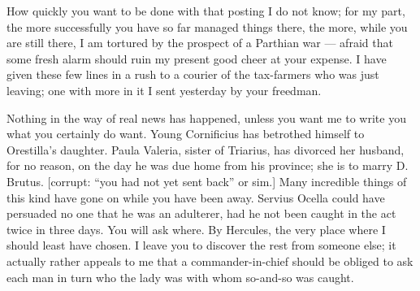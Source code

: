 

 How quickly you want to be done with that posting I do not know; for my part, the more successfully you have so far managed things there, the more, while you are still there, I am tortured by the prospect of a Parthian war --- afraid that some fresh alarm should ruin my present good cheer at your expense. I have given these few lines in a rush to a courier of the tax-farmers who was just leaving; one with more in it I sent yesterday by your freedman.

 Nothing in the way of real news has happened, unless you want me to write you what you certainly do want. Young Cornificius has betrothed himself to Orestilla's daughter. Paula Valeria, sister of Triarius, has divorced her husband, for no reason, on the day he was due home from his province; she is to marry D. Brutus. [corrupt: ``you had not yet sent back'' or sim.] Many incredible things of this kind have gone on while you have been away. Servius Ocella could have persuaded no one that he was an adulterer, had he not been caught in the act twice in three days. You will ask where. By Hercules, the very place where I should least have chosen. I leave you to discover the rest from someone else; it actually rather appeals to me that a commander-in-chief should be obliged to ask each man in turn who the lady was with whom so-and-so was caught.
